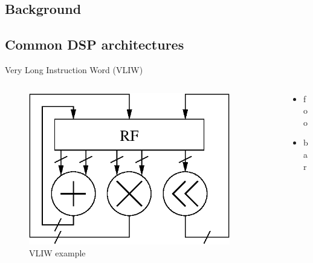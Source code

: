 \documentclass{beamer}
\begin{document}
\begin{CJK}{UTF8}{bkai}
    \section{Background}
    \subsection{Common DSP architectures}
    \begin{frame}{Very Long Instruction Word (VLIW)}
       \begin{columns}
           \begin{column}{0.5\textwidth}
               \begin{figure}[!ht]
                   \centering
                   \includegraphics[width=0.9\textwidth]{./figs/vliw.eps}
                   \caption{VLIW example}
               \end{figure}
           \end{column}
           \begin{column}{0.5\textwidth}
              \begin{itemize}
                  \item foo
                  \item bar
              \end{itemize} 
           \end{column}
       \end{columns} 
    \end{frame}


\end{CJK}
\end{document}
